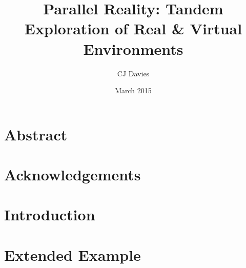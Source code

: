 \documentclass{report}
\begin{document}
\title{Parallel Reality: Tandem Exploration of Real \& Virtual Environments}
\date{March 2015}
\author{CJ Davies}





\chapter*{Abstract}



\chapter*{Acknowledgements}



\tableofcontents


\listoffigures




\chapter{Introduction}



\chapter{Extended Example}


\end{document}
